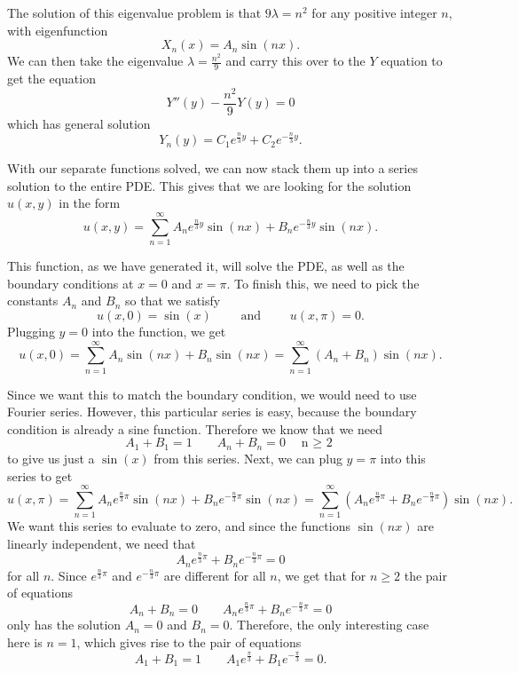 \documentclass{ximera}
\begin{document}
\begin{exampleSol}
    The solution of this eigenvalue problem is that $9\lambda = n^2$ for any positive integer $n$, with eigenfunction 
    \[ 
        X_n(x) = A_n \sin(n x). 
    \] 
    We can then take the eigenvalue $\lambda = \frac{n^2}{9}$ and carry this over to the $Y$ equation to get the equation
    \[ 
        Y''(y) - \frac{n^2}{9} Y(y) = 0 
    \] 
    which has general solution
    \[ 
        Y_n(y) = C_1 e^{\frac{n}{3}y} + C_2 e^{-\frac{n}{3} y}. 
    \]
    
    With our separate functions solved, we can now stack them up into a series solution to the entire PDE. This gives that we are looking for the solution $u(x,y)$ in the form
    \[ 
        u(x,y) = \sum_{n=1}^\infty A_n e^{\frac{n}{3}y}\sin(nx) + B_n e^{-\frac{n}{3}y}\sin(nx). 
    \]
    
    This function, as we have generated it, will solve the PDE, as well as the boundary conditions at $x=0$ and $x=\pi$. To finish this, we need to pick the constants $A_n$ and $B_n$ so that we satisfy
    \[ 
        u(x, 0) = \sin(x) \qquad \text{ and } \qquad u(x,\pi) = 0. 
    \] 
    Plugging $y=0$ into the function, we get
    \[ 
        u(x,0) = \sum_{n=1}^\infty A_n \sin(nx) + B_n\sin(nx) = \sum_{n=1}^\infty (A_n + B_n) \sin(nx) .
    \]
    
    Since we want this to match the boundary condition, we would need to use Fourier series. However, this particular series is easy, because the boundary condition is already a sine function. Therefore we know that we need
    \[
        A_1 + B_1 = 1 \qquad A_n + B_n = 0 \quad \text{n $\geq$ 2} 
    \] 
    to give us just a $\sin(x)$ from this series. Next, we can plug $y=\pi$ into this series to get
    \[ 
        u(x,\pi) = \sum_{n=1}^\infty A_n e^{\frac{n}{3}\pi}\sin(nx) + B_n e^{-\frac{n}{3}\pi}\sin(nx) = \sum_{n=1}^\infty \left( A_n e^{\frac{n}{3}\pi}+ B_n e^{-\frac{n}{3}\pi}\right)\sin(nx).
    \] 
    We want this series to evaluate to zero, and since the functions $\sin(nx)$ are linearly independent, we need that
    \[ 
        A_n e^{\frac{n}{3}\pi}+ B_n e^{-\frac{n}{3}\pi} = 0 
    \] 
    for all $n$. Since $e^{\frac{n}{3}\pi}$ and $e^{-\frac{n}{3}\pi}$ are different for all $n$, we get that for $n \geq 2$ the pair of equations 
    \[ 
        A_n + B_n = 0 \qquad A_n e^{\frac{n}{3}\pi}+ B_n e^{-\frac{n}{3}\pi} = 0
    \] 
    only has the solution $A_n = 0$ and $B_n = 0$. Therefore, the only interesting case here is $n=1$, which gives rise to the pair of equations
    \[ 
        A_1 + B_1 = 1 \qquad A_1 e^{\frac{\pi}{3}}+ B_1 e^{-\frac{\pi}{3}} = 0.
    \]
    

\end{exampleSol}
\end{document}
